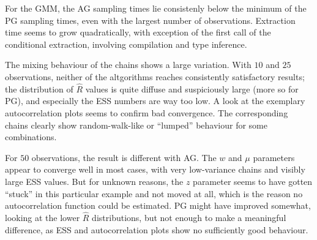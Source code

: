 For the GMM, the AG sampling times lie consistenly below the minimum of the PG sampling times, even
with the largest number of observations.  Extraction time seems to grow quadratically, with
exception of the first call of the conditional extraction, involving compilation and type
inference.

The mixing behaviour of the chains shows a large variation.  With \(10\) and \(25\) observations,
neither of the altgorithms reaches consistently satisfactory results; the distribution of
\(\widehat{R}\) values is quite diffuse and suspiciously large (more so for PG), and especially the
ESS numbers are way too low.  A look at the exemplary autocorrelation plots seems to confirm bad
convergence.  The corresponding chains clearly show random-walk-like or \enquote{lumped} behaviour
for some combinations.

For \(50\) observations, the result is different with AG.  The \(w\) and \(\mu\) parameters appear
to converge well in most cases, with very low-variance chains and visibly large ESS values.  But for
unknown reasons, the \(z\) parameter seems to have gotten \enquote{stuck} in this particular example
and not moved at all, which is the reason no autocorrelation function could be estimated.  PG might
have improved somewhat, looking at the lower \(\widehat{R}\) distributions, but not enough to make a
meaningful difference, as ESS and autocorrelation plots show no sufficiently good behaviour.


\cleartorecto
\FloatBlock

